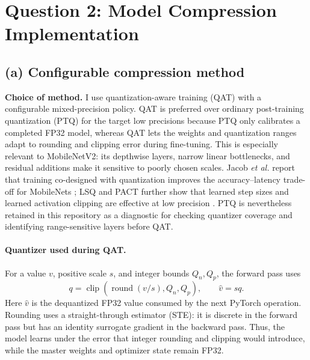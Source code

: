 \section{Question 2: Model Compression Implementation}

\subsection{(a) Configurable compression method}

\textbf{Choice of method.} I use quantization-aware training (QAT) with a
configurable mixed-precision policy. QAT is preferred over ordinary
post-training quantization (PTQ) for the target low precisions because PTQ
only calibrates a completed FP32 model, whereas QAT lets the weights and
quantization ranges adapt to rounding and clipping error during fine-tuning.
This is especially relevant to MobileNetV2: its depthwise layers, narrow
linear bottlenecks, and residual additions make it sensitive to poorly chosen
scales. Jacob \emph{et al.} report that training co-designed with quantization
improves the accuracy--latency trade-off for MobileNets
\cite{jacob2018quantization}; LSQ and PACT further show that learned step
sizes and learned activation clipping are effective at low precision
\cite{esser2020lsq,choi2018pact}. PTQ is nevertheless retained in this
repository as a diagnostic for checking quantizer coverage and identifying
range-sensitive layers before QAT.

\paragraph{Quantizer used during QAT.}
For a value $v$, positive scale $s$, and integer bounds $Q_n,Q_p$, the
forward pass uses
\[
 q = \operatorname{clip}\!\left(\operatorname{round}(v/s),Q_n,Q_p\right),
 \qquad \widehat v=sq.
\]
Here $\widehat v$ is the dequantized FP32 value consumed by the next PyTorch
operation. Rounding uses a straight-through estimator (STE): it is discrete in
the forward pass but has an identity surrogate gradient in the backward pass.
Thus, the model learns under the error that integer rounding and clipping would
introduce, while the master weights and optimizer state remain FP32.

